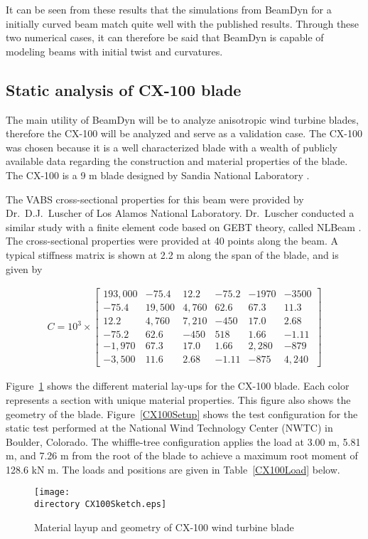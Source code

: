 \documentclass{aiaa-tc}
\def\directory{EPSF/}
\begin{document}
It can be seen from these results that the simulations from BeamDyn for a initially curved beam match quite well with the published results. Through these two numerical cases, it can therefore be said that BeamDyn is capable of modeling beams with initial twist and curvatures.

\subsection{Static analysis of CX-100 blade}
The main utility of BeamDyn will be to analyze anisotropic wind turbine blades, therefore the CX-100 will be analyzed and serve as a validation case. The CX-100 was chosen because it is a well characterized blade with a wealth of publicly available data regarding the construction and material properties of the blade. The CX-100 is a 9 m blade designed by Sandia National Laboratory \cite{paquette2006modeling}.

The VABS cross-sectional properties for this beam were provided by Dr.\ D.J.\ Luscher of Los Alamos National Laboratory. Dr.\ Luscher conducted a similar study with a finite element code based on GEBT theory, called NLBeam \cite{Luscher:2013}. The cross-sectional properties were provided at 40 points along the beam. A typical stiffness matrix is shown at 2.2 m along the span of the blade, and is given by

\begin{align*}
C =10^3 \times \begin{bmatrix}
	193,000 & -75.4   & 12.2   & -75.2  & -1970    & -3500    \\
	-75.4  & 19,500 & 4,760   & 62.6  & 67.3    & 11.3    \\
	12.2  & 4,760   & 7,210 & -450  & 17.0    & 2.68    \\
	-75.2  & 62.6   & -450   & 518 & 1.66    & -1.11    \\
	-1,970  & 67.3   & 17.0   & 1.66  & 2,280 & -879    \\
	-3,500  & 11.6   & 2.68   & -1.11  & -875    & 4,240
\end{bmatrix}
\end{align*}


Figure~\ref{CX100Sketch} \cite{paquette2006modeling} shows the different material lay-ups for the CX-100 blade. Each color represents a section with unique material properties. This figure also shows the geometry of the blade. Figure~\ref{CX100Setup} \cite{paquette2006modeling} shows the test configuration for the static test performed at the National Wind Technology Center (NWTC) in Boulder, Colorado. The whiffle-tree configuration applies the load at 3.00 m, 5.81 m, and 7.26 m from the root of the blade to achieve a maximum root moment of 128.6 kN m. The loads and positions are given in Table~\ref{CX100Load} below.
\begin{figure}
\centering
\texttt{[image: \\directory CX100Sketch.eps]}
\caption{Material layup and geometry of CX-100 wind turbine blade\cite{paquette2006modeling}} 
\label{CX100Sketch}
\end{figure}
\end{document}
